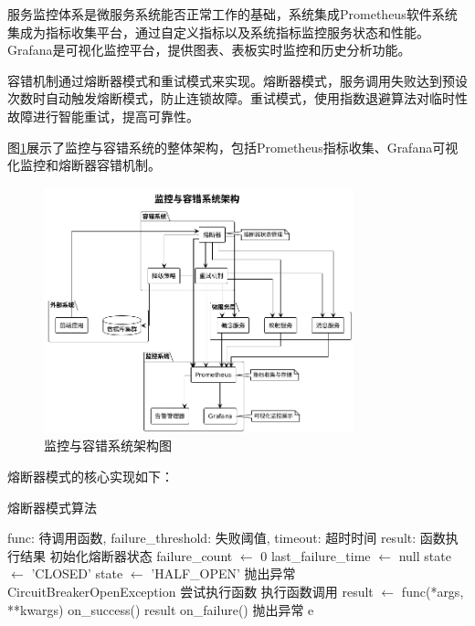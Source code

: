 服务监控体系是微服务系统能否正常工作的基础，系统集成Prometheus软件系统集成为指标收集平台，通过自定义指标以及系统指标监控服务状态和性能。Grafana是可视化监控平台，提供图表、表板实时监控和历史分析功能。

容错机制通过熔断器模式和重试模式来实现。熔断器模式，服务调用失败达到预设次数时自动触发熔断模式，防止连锁故障。重试模式，使用指数退避算法对临时性故障进行智能重试，提高可靠性。

图\ref{fig:monitoring_fault_tolerance}展示了监控与容错系统的整体架构，包括Prometheus指标收集、Grafana可视化监控和熔断器容错机制。

\begin{figure}[H]
    \centering
    \includegraphics[width=0.8\textwidth]{chapters/fig-0/monitoring_fault_tolerance.png}
    \caption{监控与容错系统架构图}
    \label{fig:monitoring_fault_tolerance}
\end{figure}

熔断器模式的核心实现如下：

\begin{algorithm}[H]
\caption{熔断器模式算法}
\begin{algorithmic}[1]
\REQUIRE func: 待调用函数, failure\_threshold: 失败阈值, timeout: 超时时间
\ENSURE result: 函数执行结果
\STATE 初始化熔断器状态
\STATE failure\_count $\leftarrow$ 0
\STATE last\_failure\_time $\leftarrow$ null
\STATE state $\leftarrow$ 'CLOSED'
        \STATE state $\leftarrow$ 'HALF\_OPEN'
    \ELSE
        \STATE 抛出异常 CircuitBreakerOpenException
    \ENDIF
\ENDIF
\STATE 尝试执行函数
\STATE 执行函数调用
\STATE result $\leftarrow$ func(*args, **kwargs)
    \STATE on\_success()
    \RETURN result
\ELSE
    \STATE on\_failure()
    \STATE 抛出异常 e
\ENDIF
\end{algorithmic}
\end{algorithm}


